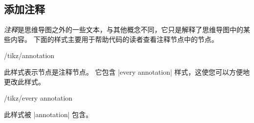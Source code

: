 \subsection{添加注释}


\emph{注释}是思维导图之外的一些文本，与其他概念不同，它只是解释了思维导图中的某些内容。 下面的样式主要用于帮助代码的读者查看注释节点中的节点。

\begin{stylekey}{/tikz/annotation}

    此样式表示节点是注释节点。 它包含 |every annotation| 样式，这使您可以方便地更改此样式。
\begin{codeexample}[preamble={\usetikzlibrary{mindmap}}]
\end{codeexample}
    \begin{stylekey}{/tikz/every annotation}

        此样式被 |annotation| 包含。
    \end{stylekey}
\end{stylekey}

\clearpage

